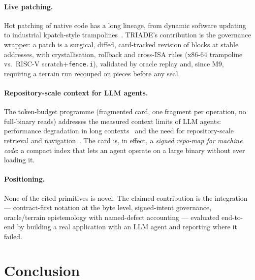 \documentclass[11pt,a4paper]{article}
\newcommand{\code}[1]{\texttt{\small #1}}
\begin{document}
\paragraph{Live patching.} Hot patching of native code has a long
lineage, from dynamic software updating~\cite{hicks2002} to industrial
kpatch-style trampolines~\cite{kpatch}. TRIADE's contribution is the
governance wrapper: a patch is a surgical, diffed, card-tracked revision
of blocks at stable addresses, with crystallisation, rollback and
cross-ISA rules (x86-64 trampoline vs.\ RISC-V scratch+\code{fence.i}),
validated by oracle replay and, since M9, requiring a terrain run
recouped on pieces before any seal.

\paragraph{Repository-scale context for LLM agents.} The token-budget
programme (fragmented card, one fragment per operation, no full-binary
reads) addresses the measured context limits of LLM agents: performance
degradation in long contexts~\cite{liu2024} and the need for
repository-scale retrieval and navigation~\cite{zhang2023, jimenez2024}.
The card is, in effect, a \emph{signed repo-map for machine code}: a
compact index that lets an agent operate on a large binary without ever
loading it.

\paragraph{Positioning.} None of the cited primitives is novel. The
claimed contribution is the integration --- contract-first notation at
the byte level, signed-intent governance, oracle/terrain epistemology
with named-defect accounting --- evaluated end-to-end by building a real
application with an LLM agent and reporting where it failed.

\section{Conclusion}\label{sec:conclusion}
\end{document}
